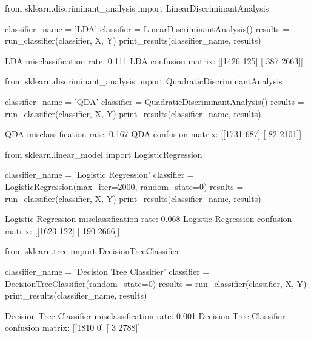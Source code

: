 \begin{python}
from sklearn.discriminant_analysis import LinearDiscriminantAnalysis

classifier_{n}ame = 'LDA'
classifier = LinearDiscriminantAnalysis()
results = run_classifier(classifier, X, Y)
print_results(classifier_{n}ame, results)
\end{python}

\begin{console}
LDA misclassification rate: 0.111
LDA confusion matrix:
[[1426  125]
 [ 387 2663]]
\end{console}

\begin{python}
from sklearn.discriminant_analysis import QuadraticDiscriminantAnalysis

classifier_{n}ame = 'QDA'
classifier = QuadraticDiscriminantAnalysis()
results = run_classifier(classifier, X, Y)
print_results(classifier_{n}ame, results)
\end{python}

\begin{console}
QDA misclassification rate: 0.167
QDA confusion matrix:
[[1731  687]
 [  82 2101]]
\end{console}

\begin{python}
from sklearn.linear_model import LogisticRegression

classifier_{n}ame = 'Logistic Regression'
classifier = LogisticRegression(max_{i}ter=2000, random_state=0)
results = run_classifier(classifier, X, Y)
print_results(classifier_{n}ame, results)
\end{python}

\begin{console}
Logistic Regression misclassification rate: 0.068
Logistic Regression confusion matrix:
[[1623  122]
 [ 190 2666]]
\end{console}

\begin{python}
from sklearn.tree import DecisionTreeClassifier

classifier_{n}ame = 'Decision Tree Classifier'
classifier = DecisionTreeClassifier(random_state=0)
results = run_classifier(classifier, X, Y)
print_results(classifier_{n}ame, results)
\end{python}

\begin{console}
Decision Tree Classifier misclassification rate: 0.001
Decision Tree Classifier confusion matrix:
[[1810    0]
 [   3 2788]]
\end{console}

